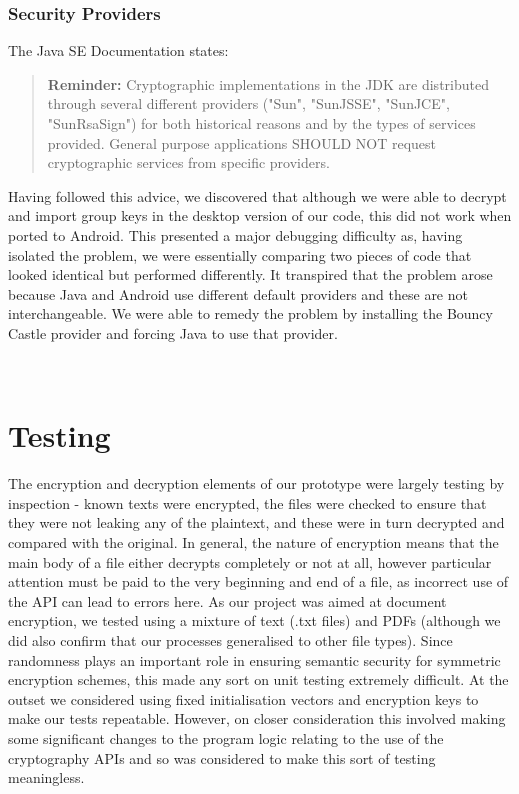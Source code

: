 \subsubsection*{Security Providers}
The Java SE Documentation states:
\begin{quotation}
\textbf{Reminder: }Cryptographic implementations in the JDK are distributed through several different providers ("Sun", "SunJSSE", "SunJCE", "SunRsaSign") for both historical reasons and by the types of services provided. General purpose applications SHOULD NOT request cryptographic services from specific providers. \cite{javasedoc}
\end{quotation} 
Having followed this advice, we discovered that although we were able to decrypt and import group keys in the desktop version of our code, this did not work when ported to Android.  This presented a major debugging difficulty as, having isolated the problem, we were essentially comparing two pieces of code that looked identical but performed differently.  It transpired that the problem arose because Java and Android use different default providers and these are not interchangeable.  We were able to remedy the problem by installing the Bouncy Castle provider and forcing Java to use that provider.

\\




\section{Testing}

The encryption and decryption elements of our prototype were largely testing by inspection - known texts were encrypted, the files were checked to ensure that they were not leaking any of the plaintext, and these were in turn decrypted and compared with the original.   In general, the nature of encryption means that the main body of a file either decrypts completely or not at all, however particular attention must be paid to the very beginning and end of a file, as incorrect use of the API can lead to errors here.  As our project was aimed at document encryption, we tested using a mixture of text (.txt files) and PDFs (although we did also confirm that our processes generalised to other file types).  Since randomness plays an important role in ensuring  semantic security  for symmetric encryption schemes, this made any sort on unit testing extremely difficult.  At the outset we considered using fixed initialisation vectors and encryption keys to make our tests repeatable.  However, on closer consideration this involved making some significant changes to the program logic relating to the use of the cryptography APIs and so was considered to make this sort of testing meaningless.  

